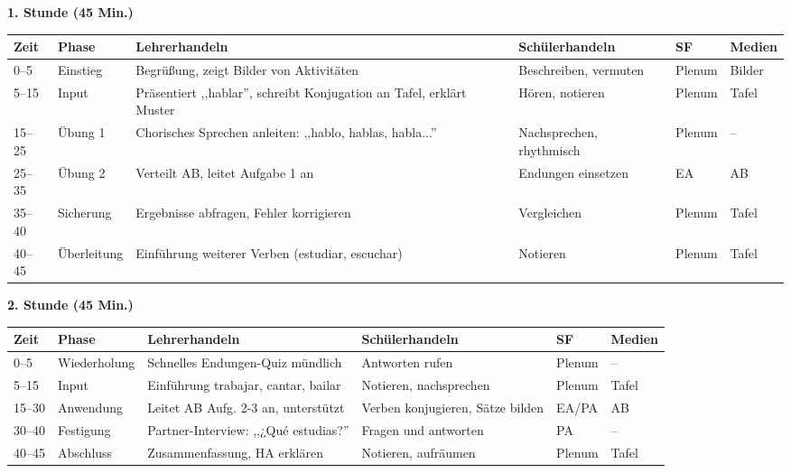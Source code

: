 \documentclass[11pt,a4paper]{article}
\begin{document}
\textbf{1. Stunde (45 Min.)}

\begin{longtable}{|p{1cm}|p{1.5cm}|p{4cm}|p{3cm}|p{2cm}|p{2cm}|}
\hline
\textbf{Zeit} & \textbf{Phase} & \textbf{Lehrerhandeln} & \textbf{Schülerhandeln} & \textbf{SF} & \textbf{Medien} \\
\hline
\endhead

0--5 & Einstieg & Begrüßung, zeigt Bilder von Aktivitäten & Beschreiben, vermuten & Plenum & Bilder \\
\hline

5--15 & Input & Präsentiert ,,hablar'', schreibt Konjugation an Tafel, erklärt Muster & Hören, notieren & Plenum & Tafel \\
\hline

15--25 & Übung 1 & Chorisches Sprechen anleiten: ,,hablo, hablas, habla...'' & Nachsprechen, rhythmisch & Plenum & -- \\
\hline

25--35 & Übung 2 & Verteilt AB, leitet Aufgabe 1 an & Endungen einsetzen & EA & AB \\
\hline

35--40 & Sicherung & Ergebnisse abfragen, Fehler korrigieren & Vergleichen & Plenum & Tafel \\
\hline

40--45 & Über\-leitung & Einführung weiterer Verben (estudiar, escuchar) & Notieren & Plenum & Tafel \\
\hline
\end{longtable}

\vspace{1em}

\textbf{2. Stunde (45 Min.)}

\begin{longtable}{|p{1cm}|p{1.5cm}|p{4cm}|p{3cm}|p{2cm}|p{2cm}|}
\hline
\textbf{Zeit} & \textbf{Phase} & \textbf{Lehrerhandeln} & \textbf{Schülerhandeln} & \textbf{SF} & \textbf{Medien} \\
\hline
\endhead

0--5 & Wieder\-holung & Schnelles Endungen-Quiz mündlich & Antworten rufen & Plenum & -- \\
\hline

5--15 & Input & Einführung trabajar, cantar, bailar & Notieren, nachsprechen & Plenum & Tafel \\
\hline

15--30 & Anwen\-dung & Leitet AB Aufg. 2-3 an, unterstützt & Verben konjugieren, Sätze bilden & EA/PA & AB \\
\hline

30--40 & Festigung & Partner-Interview: ,,¿Qué estudias?'' & Fragen und antworten & PA & -- \\
\hline

40--45 & Abschluss & Zusammenfassung, HA erklären & Notieren, aufräumen & Plenum & Tafel \\
\hline
\end{longtable}
\end{document}
